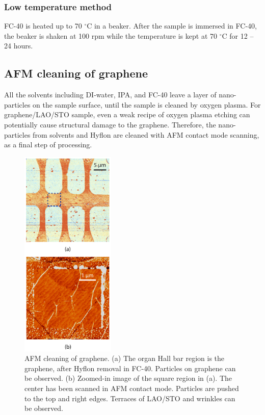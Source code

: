 \documentclass[pdflatex, sectionletters, 12pt]{pittetd}    %
\begin{document}
\subsubsection{Low temperature method} FC-40 is heated up to 70 $^{\circ}$C in a beaker. After the sample is immersed in FC-40, the beaker is shaken at 100 rpm while the temperature is kept at 70 $^{\circ}$C for 12 -- 24 hours.
\\

\subsection{AFM cleaning of graphene}

All the solvents including DI-water, IPA, and FC-40 leave a layer of nano-particles on the sample surface, until the sample is cleaned by oxygen plasma. For graphene/LAO/STO sample, even a weak recipe of oxygen plasma etching can potentially cause structural damage to the graphene. Therefore, the nano-particles from solvents and Hyflon are cleaned with AFM contact mode scanning, as a final step of processing. 

\begin{figure}[p]
	\centering
	\includegraphics[width=0.4\textwidth]{Drawing/GrapheneAC.pdf}
	\caption{AFM cleaning of graphene. (a) The organ Hall bar region is the graphene, after Hyflon removal in FC-40. Particles on graphene can be observed. (b) Zoomed-in image of the square region in (a). The center has been scanned in AFM contact mode. Particles are pushed to the top and right edges. Terraces of LAO/STO and wrinkles can be observed.}
	\label{FIG:GrapheneAC}
\end{figure}
\end{document}
